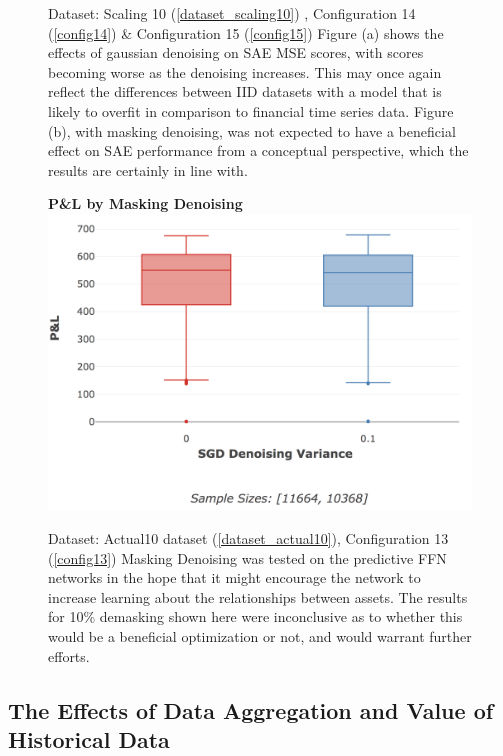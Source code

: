 \documentclass[a4paper,11pt,oneside]{article}
\theoremstyle{plain}
\theoremstyle{definition}
\begin{document}
\begin{figure}[H]
		\caption[Effects of Denoising on SAE MSE (Actual Data)]{Dataset: Scaling 10 (\ref{dataset_scaling10}) , Configuration 14 (\ref{config14}) \& Configuration 15 (\ref{config15})
			\newline Figure (a) shows the effects of gaussian denoising on SAE MSE scores, with scores becoming worse as the denoising increases. This may once again reflect the differences between IID datasets with a model that is likely to overfit in comparison to financial time series data. Figure (b), with masking denoising, was not expected to have a beneficial effect on SAE performance from a conceptual perspective, which the results are certainly in line with. }
		\label{figure-results_mse_denoising}
	\end{figure}
	
	\begin{figure}[H]
		\textbf{P\&L by Masking Denoising}
		\centering
		\includegraphics[scale=0.35]{images/results/network/denoising/actual_pl_masking.png}
		\caption[P\&L by Masking Denoising]{Dataset: Actual10 dataset (\ref{dataset_actual10}), Configuration 13 (\ref{config13})
			\newline Masking Denoising was tested on the predictive FFN networks in the hope that it might encourage the network to increase learning about the relationships between assets. The results for 10\% demasking shown here were inconclusive as to whether this would be a beneficial optimization or not, and would warrant further efforts.}
		\label{figure-actual_pl_masking}
	\end{figure}
	
	
	
	\newpage
	\subsection{The Effects of Data Aggregation and Value of Historical Data}\label{results_hist}
	
\end{document}

